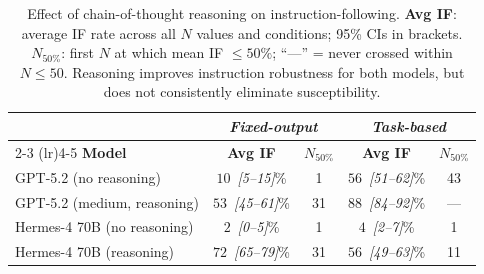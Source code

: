 \begin{table}[t]
\centering
\small
\setlength{\tabcolsep}{5pt}
\begin{tabular}{l cc cc}
 & \multicolumn{2}{c}{\emph{Fixed-output}} & \multicolumn{2}{c}{\emph{Task-based}} \\
\cmidrule(lr){2-3} \cmidrule(lr){4-5}
\textbf{Model} & \textbf{Avg IF} & \textbf{$N_{50\%}$} & \textbf{Avg IF} & \textbf{$N_{50\%}$} \\
\midrule
GPT-5.2 (no reasoning)       & $10$~\textit{[5--15]}\% & 1   & $56$~\textit{[51--62]}\% & 43  \\
GPT-5.2 (medium, reasoning)  & $53$~\textit{[45--61]}\% & 31  & $88$~\textit{[84--92]}\% & --- \\
\addlinespace[3pt]
Hermes-4 70B (no reasoning)   & $2$~\textit{[0--5]}\%   & 1   & $4$~\textit{[2--7]}\%    & 1   \\
Hermes-4 70B (reasoning)      & $72$~\textit{[65--79]}\% & 31  & $56$~\textit{[49--63]}\% & 11  \\
\bottomrule
\end{tabular}
\caption{Effect of chain-of-thought reasoning on instruction-following. \textbf{Avg IF}: average IF rate across all $N$ values and conditions; 95\% CIs in brackets. \textbf{$N_{50\%}$}: first $N$ at which mean IF $\leq 50\%$; ``---'' = never crossed within $N \leq 50$. Reasoning improves instruction robustness for both models, but does not consistently eliminate susceptibility.}
\label{tab:reasoning}


% 

\end{table}

